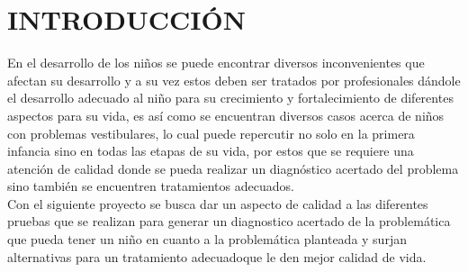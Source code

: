 \thispagestyle{empty}
\section*{INTRODUCCIÓN}
	En el  desarrollo  de  los  niños se  puede encontrar  diversos  inconvenientes  que afectan su desarrollo y a su vez estos deben ser tratados por profesionales dándole el desarrollo adecuado al niño para su crecimiento y fortalecimiento de diferentes aspectos para su vida, es así como se encuentran diversos casos acerca de niños con problemas vestibulares, lo cual puede repercutir no solo en la primera infancia sino  en  todas  las etapas  de  su  vida, por  estos  que  se  requiere  una  atención  de calidad donde se pueda realizar un diagnóstico acertado del problema sino también se encuentren tratamientos adecuados.\\
    
    Con  el  siguiente  proyecto  se  busca  dar  un  aspecto  de  calidad  a  las  diferentes pruebas que se realizan para generar un diagnostico acertado de la problemática que pueda tener un niño en cuanto a la problemática planteada y surjan alternativas para un tratamiento adecuadoque le den mejor calidad de vida.\\